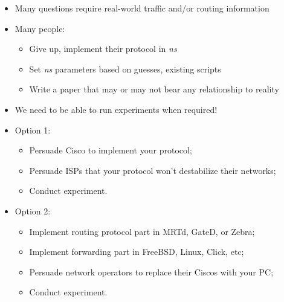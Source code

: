 \documentclass[landscape]{icsislides}
\begin{document}
\begin{slide}

\begin{itemize}
  \item Many questions require real-world traffic and/or routing information

  \item Many people:
  \begin{itemize}
    \item Give up, implement their protocol in \emph{ns}
    \item Set \emph{ns} parameters based on guesses, existing scripts
    \item Write a paper that may or may not bear any relationship to reality
  \end{itemize}

  \item We need to be able to run experiments when required!

\end{itemize}

\end{slide}

\begin{slide}

\begin{itemize}
  \item Option 1:
  \begin{itemize}
    \item Persuade Cisco to implement your protocol;
    \item Persuade ISPs that your protocol won't destabilize their networks;
    \item Conduct experiment.
  \end{itemize}

\end{itemize}

\end{slide}

\begin{slide}

\begin{itemize}
  \item Option 2:
  \begin{itemize}
    \item Implement routing protocol part in MRTd, GateD, or Zebra;
    \item Implement forwarding part in FreeBSD, Linux, Click, etc;
    \item Persuade network operators to replace their Ciscos with your PC;
    \item Conduct experiment.
  \end{itemize}

\end{itemize}

\end{slide}
\end{document}
